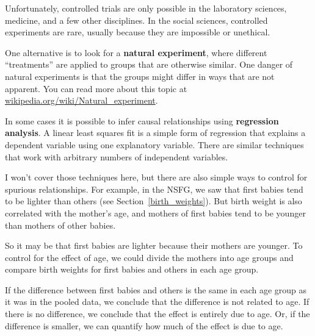 \documentclass[12pt]{book}
\begin{document}
Unfortunately, controlled trials are only possible in the laboratory
sciences, medicine, and a few other disciplines.  In the social sciences,
controlled experiments are rare, usually because they are impossible
or unethical.

One alternative is to look for a {\bf natural experiment}, where
different ``treatments'' are applied to groups that are otherwise
similar.  One danger of natural experiments is that the groups might
differ in ways that are not apparent.  You can read more about this
topic at \url{wikipedia.org/wiki/Natural_experiment}.

In some cases it is possible to infer causal relationships using {\bf
  regression analysis}.  A linear least squares fit
is a simple form of regression that explains a dependent
variable using one explanatory variable.  There are similar
techniques that work with arbitrary numbers of independent variables.

I won't cover those techniques here, but there are also simple ways to
control for spurious relationships.  For example, in the NSFG, we saw
that first babies tend to be lighter than others (see
Section~\ref{birth_weights}).  But birth weight is also correlated
with the mother's age, and mothers of first babies tend to be younger
than mothers of other babies.

So it may be that first babies are lighter because their mothers are
younger.  To control for the effect of age, we could divide the mothers
into age groups and compare birth weights for first babies and others
in each age group.

If the difference between first babies and others is the same in
each age group as it was in the pooled data, we conclude
that the difference is not related to age.  If there is no difference,
we conclude that the effect is entirely due to age.  Or,
if the difference is smaller, we can quantify how much of the effect
is due to age.
\end{document}
